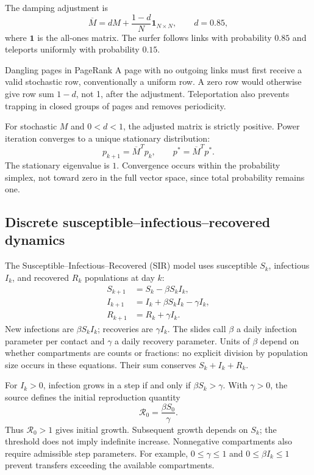 \documentclass[11pt,a4paper]{article}
\numberwithin{equation}{section}
\numberwithin{figure}{section}
\numberwithin{table}{section}
\begin{document}
The damping adjustment is
\begin{equation}\label{eq:google}\overline M=dM+\frac{1-d}{N}\mathbf1_{N\times N},\qquad d=0.85,\end{equation}
where $\mathbf1$ is the all-ones matrix. The surfer follows links with probability $0.85$ and teleports uniformly with probability $0.15$.

\begin{supplementary}{Dangling pages in PageRank}
A page with no outgoing links must first receive a valid stochastic row, conventionally a uniform row. A zero row would otherwise give row sum $1-d$, not 1, after the adjustment. Teleportation also prevents trapping in closed groups of pages and removes periodicity.
\end{supplementary}

For stochastic $M$ and $0<d<1$, the adjusted matrix is strictly positive. Power iteration converges to a unique stationary distribution:
\begin{equation}p_{k+1}=\overline M^Tp_k,\qquad p^*=\overline M^Tp^*.\end{equation}
The stationary eigenvalue is $1$. Convergence occurs within the probability simplex, not toward zero in the full vector space, since total probability remains one.

\subsection{Discrete susceptible--infectious--recovered dynamics}
The Susceptible--Infectious--Recovered (SIR) model uses susceptible $S_k$, infectious $I_k$, and recovered $R_k$ populations at day $k$:
\begin{align}
S_{k+1}&=S_k-\beta S_kI_k,\\
I_{k+1}&=I_k+\beta S_kI_k-\gamma I_k,\\
R_{k+1}&=R_k+\gamma I_k.
\end{align}
New infections are $\beta S_kI_k$; recoveries are $\gamma I_k$. The slides call $\beta$ a daily infection parameter per contact and $\gamma$ a daily recovery parameter. Units of $\beta$ depend on whether compartments are counts or fractions: no explicit division by population size occurs in these equations. Their sum conserves $S_k+I_k+R_k$.

For $I_k>0$, infection grows in a step if and only if $\beta S_k>\gamma$. With $\gamma>0$, the source defines the initial reproduction quantity
\begin{equation}\mathcal R_0=\frac{\beta S_0}{\gamma}.\end{equation}
Thus $\mathcal R_0>1$ gives initial growth. Subsequent growth depends on $S_k$; the threshold does not imply indefinite increase. Nonnegative compartments also require admissible step parameters. For example, $0\le\gamma\le1$ and $0\le\beta I_k\le1$ prevent transfers exceeding the available compartments.
\end{document}
